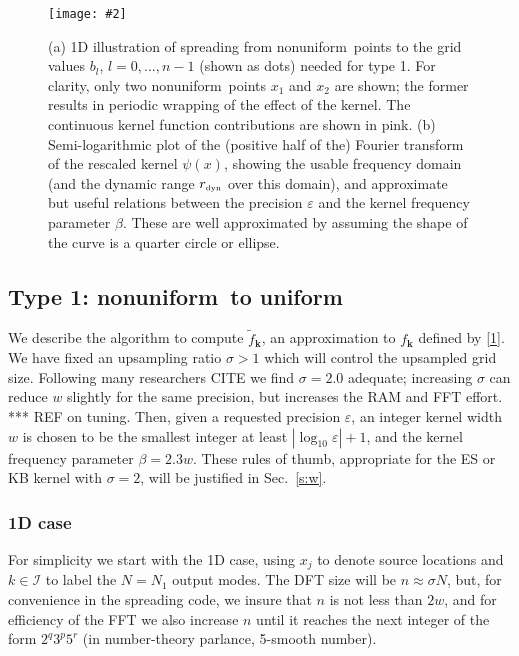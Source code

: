 \documentclass[10pt]{article}
\newcommand{\bfi}{\begin{figure}}
\newcommand{\efi}{\end{figure}}
\newcommand{\ca}[2]{\caption{#1 \label{#2}}}
\newcommand{\ig}[2]{\texttt{[image: \#2]}}
\newcommand{\tbox}[1]{{\mbox{\tiny #1}}}
\newcommand{\mbf}[1]{{\mathbf #1}}
\newcommand{\eps}{\varepsilon}
\newcommand{\kk}{\mbf{k}}
\newcommand{\KK}{{\mathcal I}}     %
\newcommand{\freq}{\beta}          %
\newcommand{\rat}{\sigma}          %
\newcommand{\rmax}{r_\tbox{dyn}}    %
\newcommand{\NU}{{nonuniform}}       %
\newcommand{\U}{{uniform}}
\begin{document}
\bfi[t]  %
\ig{width=6.5in}{spreadalias.eps}
\ca{(a) 1D illustration of spreading from \NU\ points to the grid
  values $b_l$, $l=0,\dots,n-1$ (shown as dots) needed for type 1.
  For clarity, only two \NU\ points $x_1$ and $x_2$ are shown;
  the former results in periodic wrapping of the effect of the kernel.
  The continuous kernel function contributions are shown in pink.
  (b) Semi-logarithmic plot of the (positive half of the)
  Fourier transform of the rescaled
  kernel $\psi(x)$, showing the usable frequency domain (and the
  dynamic range $\rmax$ over this domain), and approximate
  but useful relations between the precision $\eps$
  and the kernel frequency parameter $\beta$.
  These are well approximated by assuming the shape of the curve is
  a quarter circle or ellipse.
}{f:spreadalias}
\efi




\subsection{Type 1: \NU\ to \U}

We describe the algorithm to compute $\tilde f_\kk$, an approximation
to $f_\kk$ defined by \eqref{1}.
We have fixed an upsampling ratio $\rat>1$ which will control the
upsampled grid size.
Following many researchers CITE we find $\rat=2.0$ adequate;
increasing $\rat$ can reduce $w$ slightly for the same precision,
but increases the RAM and FFT effort.
*** REF on tuning.
Then, given a requested precision $\eps$,
an integer kernel width $w$ is chosen
to be the smallest integer at least $|\log_{10} \eps| + 1$,
and the kernel frequency parameter $\freq = 2.3 w$.
These rules of thumb, appropriate for the ES or KB kernel with
$\rat=2$, will be justified in Sec.~\ref{s:w}.

\subsubsection{1D case}
\label{s:1d1}

For simplicity we start with the 1D case, using $x_j$ to denote source
locations and $k\in\KK$ to label the $N=N_1$ output modes.
The DFT size will be $n \approx \rat N$,
but, for convenience in the spreading code, we insure that $n$
is not less than $2w$,
and for efficiency of the FFT we also increase $n$ until it reaches the next
integer of the form $2^q3^p5^r$ (in number-theory parlance, 5-smooth number).
\end{document}
